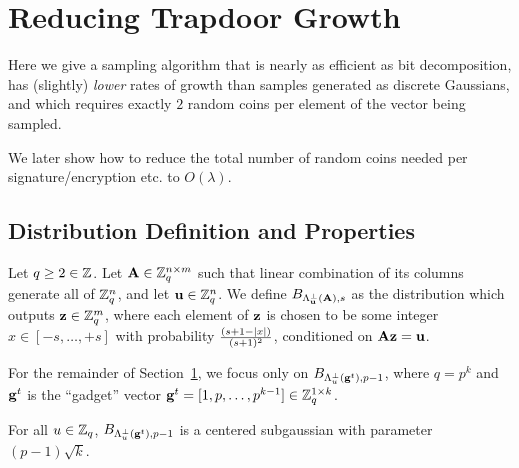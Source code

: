 
\section{Reducing Trapdoor Growth}
\label{sec:redtrapgrowth}

\newcommand{\sign}{\textsf{sign}}
\newcommand{\Exp}{\mathbb{E}}


Here we give a sampling algorithm that is nearly as efficient as bit
decomposition, has (slightly) \emph{lower} rates of growth than
samples generated as discrete Gaussians, and which requires exactly
$2$ random coins per element of the vector being sampled.

We later show how to reduce the total number of random coins needed
per signature/encryption etc. to $O(\lambda)$. 




\subsection{Distribution Definition and Properties}
\label{sec:lemm-about-distr}

\begin{definition}\label{def:dist-def}
Let $q\geq 2 \in \mathbb{Z}$. Let $\mathbf{A} \in \mathbb{Z}_q^{n
  \times m}$ such that linear combination of its columns generate all
of $\mathbb{Z}_q^{n}$, and let $\mathbf{u} \in \mathbb{Z}_q^{n}$.
We define $B_{\Lambda^{\perp}_{\mathbf{u}}(\mathbf{A}),s}$ as the distribution which
outputs $\mathbf{z} \in \mathbb{Z}_q^m$, where each element of $\mathbf{z}$ is chosen to
be some integer $x \in [-s,\ldots,+s]$ with probability $\tfrac{(s+1-\lvert x\rvert)}{(s+1)^2}$, conditioned on
$\mathbf{A}\mathbf{z}=\mathbf{u}$. 
\end{definition}

For the remainder of Section~\ref{sec:redtrapgrowth}, we focus only on 
$B_{\Lambda^{\perp}_{u}(\mathbf{g}^t),p-1}$, where  $q=p^k$ and $\mathbf{g}^{t}$ is the ``gadget''
vector $\mathbf{g}^{t}=[1,p,\ldots,p^{k-1}] \in \mathbb{Z}_q^{1 \times k}$.
\begin{lemma}\label{lem:centered-subgaussian}
For all $u \in \mathbb{Z}_q$,
$B_{\Lambda^{\perp}_{u}(\mathbf{g}^t),p-1}$ is a centered subgaussian with parameter
$(p-1)\sqrt{k}$.
\end{lemma}

